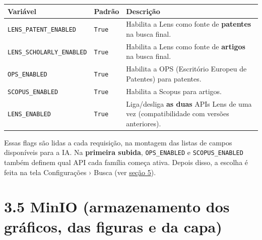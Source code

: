 \documentclass[
  brazilian,
  a4paper,12pt,oneside]{report}
\newcounter{none} %
\begin{document}
{\def\LTcaptype{none} %
\begin{longtable}[]{@{}
  >{\raggedright\arraybackslash}p{}
  >{\raggedright\arraybackslash}p{}
  >{\raggedright\arraybackslash}p{}@{}}
\toprule\noalign{}
\begin{minipage}[b]{\linewidth}\raggedright
Variável
\end{minipage} & \begin{minipage}[b]{\linewidth}\raggedright
Padrão
\end{minipage} & \begin{minipage}[b]{\linewidth}\raggedright
Descrição
\end{minipage} \\
\midrule\noalign{}
\endhead
\bottomrule\noalign{}
\endlastfoot
\texttt{LENS\_}\allowbreak{}\texttt{PATENT\_}\allowbreak{}\texttt{ENABLED}
& \texttt{True} & Habilita a Lens como fonte de \textbf{patentes} na
busca final. \\
\texttt{LENS\_}\allowbreak{}\texttt{SCHOLARLY\_}\allowbreak{}\texttt{ENABLED}
& \texttt{True} & Habilita a Lens como fonte de \textbf{artigos} na
busca final. \\
\texttt{OPS\_}\allowbreak{}\texttt{ENABLED} & \texttt{True} & Habilita a
OPS (Escritório Europeu de Patentes) para patentes. \\
\texttt{SCOPUS\_}\allowbreak{}\texttt{ENABLED} & \texttt{True} &
Habilita a Scopus para artigos. \\
\texttt{LENS\_}\allowbreak{}\texttt{ENABLED} & \texttt{True} &
Liga/desliga \textbf{as duas} APIs Lens de uma vez (compatibilidade com
versões anteriores). \\
\end{longtable}
}

Essas flags são lidas a cada requisição, na montagem das listas de
campos disponíveis para a IA. Na \textbf{primeira subida},
\texttt{OPS\_}\allowbreak{}\texttt{ENABLED} e
\texttt{SCOPUS\_}\allowbreak{}\texttt{ENABLED} também definem qual API
cada família começa ativa. Depois disso, a escolha é feita na tela
Configurações › Busca (ver \hyperref[5-apis-de-busca]{seção 5}).

\section{3.5 MinIO (armazenamento dos gráficos, das figuras e da
capa)}\label{minio-armazenamento-dos-gruxe1ficos-das-figuras-e-da-capa}
\end{document}
